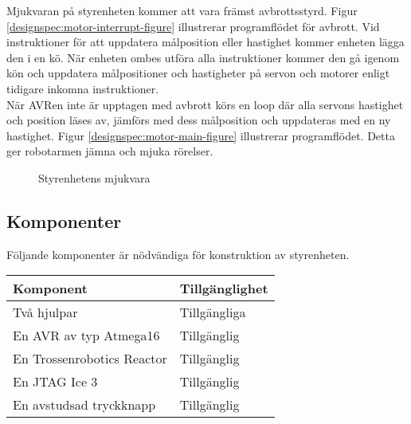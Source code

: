 Mjukvaran på styrenheten kommer att vara främst avbrottsstyrd. Figur \ref{designspec:motor-interrupt-figure} illustrerar programflödet för avbrott. Vid instruktioner för att uppdatera målposition eller hastighet kommer enheten lägga den i en kö. När enheten ombes utföra alla instruktioner kommer den gå igenom kön och uppdatera målpositioner och hastigheter på servon och motorer enligt tidigare inkomna instruktioner. \\
När AVRen inte är upptagen med avbrott körs en loop där alla servons hastighet och position läses av, jämförs med dess målposition och uppdateras med en ny hastighet. Figur \ref{designspec:motor-main-figure} illustrerar programflödet. Detta ger robotarmen jämna och mjuka rörelser. \\

\begin{figure}[H]
\centering
\begin{minipage}[b]{.5\linewidth}
\centering
\scalebox{0.7}{}
\label{designspec:motor-interrupt-figure}
\end{minipage}%
\begin{minipage}[b]{.5\linewidth}
\centering
\scalebox{0.6}{}
\label{designspec:motor-main-figure}
\end{minipage}
\caption{Styrenhetens mjukvara}\label{fig:1}
\end{figure}

\subsection{Komponenter}
Följande komponenter är nödvändiga för konstruktion av styrenheten. \\
\begin{tabularx}{\textwidth}{| l | X |}
	\hline
	{\textbf{Komponent}} & {\textbf{Tillgänglighet}} \\\hline
	{Två hjulpar} & {Tillgängliga} \\\hline
	{En AVR av typ Atmega16} & {Tillgänglig} \\\hline
	{En Trossenrobotics Reactor} & {Tillgänglig} \\\hline
	{En JTAG Ice 3} & {Tillgänglig} \\\hline
	{En avstudsad tryckknapp} & {Tillgänglig} \\\hline
\end{tabularx}